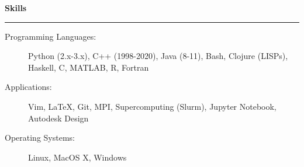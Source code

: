 \documentclass[letterpaper,11pt]{article}
\newcommand{\sectionline}{
    \noindent\rule[0.5ex]{\linewidth}{0.5pt}
}
\newcommand{\resheading}[1]{
    {\large \textbf{#1}}
    \sectionline
}
\begin{document}
\resheading{Skills}
\begin{description}
    \item[Programming Languages:] 
        Python (2.x-3.x), C++ (1998-2020), Java (8-11), Bash, Clojure (LISPs), Haskell, C, MATLAB, R, Fortran
    \item[Applications:]
        Vim, \LaTeX, Git, MPI, Supercomputing (Slurm), Jupyter Notebook, Autodesk Design 
    \item[Operating Systems:]
        Linux, MacOS X, Windows
    


\end{description}
\end{document}
